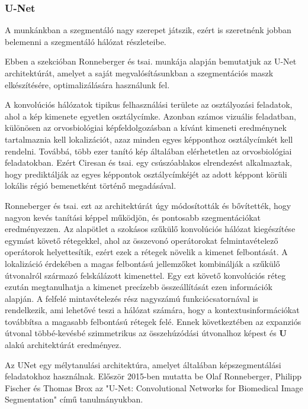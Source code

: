 \documentclass[12pt,a4]{article}
\begin{document}
            \subsubsection{U-Net}
    
                A munkánkban a szegmentáló nagy szerepet játszik, ezért is szeretnénk jobban belemenni a szegmentáló hálózat részleteibe.
    
                Ebben a szekcióban Ronneberger és tsai. \cite{unet} munkája alapján bemutatjuk az U-Net architektúrát, amelyet a saját megvalósításunkban a szegmentációs maszk elkészítésére, optimalizálására használunk fel. 
    
                A konvolúciós hálózatok tipikus felhasználási területe az osztályozási feladatok, ahol a kép kimenete egyetlen osztálycímke. Azonban számos vizuális feladatban, különösen az orvosbiológiai képfeldolgozásban a kívánt kimeneti eredménynek tartalmaznia kell lokalizációt, azaz minden egyes képponthoz osztálycímkét kell rendelni. Továbbá, több ezer tanító kép általában elérhetetlen az orvosbiológiai feladatokban. Ezért Ciresan és tsai. \cite{ciresan} egy csúszóablakos elrendezést alkalmaztak, hogy prediktálják
                az egyes képpontok osztálycímkéjét az adott képpont körüli lokális régió bemenetként történő megadásával.
    
                Ronneberger és tsai. \cite{unet} ezt az architektúrát úgy módosították és bővítették, hogy
                nagyon kevés tanítási képpel működjön, és pontosabb szegmentációkat eredményezzen.
                Az alapötlet a szokásos szűkülő konvolúciós hálózat kiegészítése egymást követő rétegekkel, ahol az összevonó operátorokat felmintavételező operátorok helyettesítik, ezért ezek a rétegek növelik a kimenet felbontását. A lokalizáció érdekében a magas felbontású jellemzőket kombinálják a szűkülő útvonalról származó felskálázott kimenettel. Egy ezt követő konvolúciós réteg ezután megtanulhatja a kimenet precízebb összeállítását ezen információk alapján. A felfelé mintavételezés rész nagyszámú funkciócsatornával is rendelkezik, ami lehetővé teszi a hálózat számára, hogy a kontextusinformációkat továbbítsa a magasabb felbontású rétegek felé. Ennek következtében az expanziós útvonal többé-kevésbé szimmetrikus az összehúzódási útvonalhoz képest és \textbf{U} alakú architektúrát eredményez.
    
                Az UNet egy mélytanulási architektúra, amelyet általában képszegmentálási feladatokhoz használnak. Először 2015-ben mutatta be Olaf Ronneberger, Philipp Fischer és Thomas Brox \cite{unet} az "U-Net: Convolutional Networks for Biomedical Image Segmentation" című tanulmányukban.
    
\end{document}
